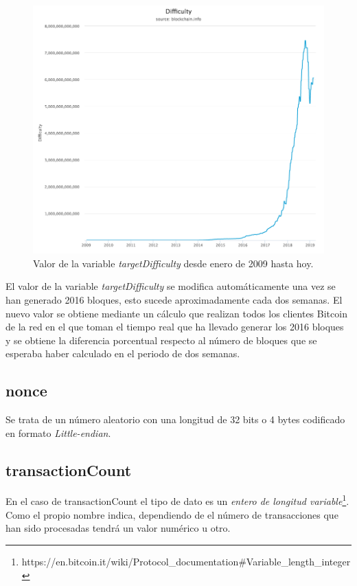 \documentclass{article}
\begin{document}
    \begin{figure}[H]
    \centering
        \includegraphics[scale=0.39]{img/Bitcoin_TargetDifficulty.png}
        \caption{Valor de la variable \textit{targetDifficulty} desde enero de 2009 hasta hoy.}
    \end{figure}
    
    El valor de la variable \textit{targetDifficulty} se modifica automáticamente una vez se han generado 2016 bloques, esto sucede aproximadamente cada dos semanas. El nuevo valor se obtiene mediante un cálculo que realizan todos los clientes Bitcoin de la red en el que toman el tiempo real que ha llevado generar los 2016 bloques y se obtiene la diferencia porcentual respecto al número de bloques que se esperaba haber calculado en el periodo de dos semanas.
    
    \subsection{nonce}
    Se trata de un número aleatorio con una longitud de 32 bits o 4 bytes codificado en formato \textit{Little-endian}.
    
    \subsection{transactionCount}
    En el caso de transactionCount el tipo de dato es un \textit{entero de longitud variable}\footnote{https://en.bitcoin.it/wiki/Protocol\_documentation\#Variable\_length\_integer}. Como el propio nombre indica, dependiendo de el número de transacciones que han sido procesadas tendrá un valor numérico u otro.
    
\end{document}
